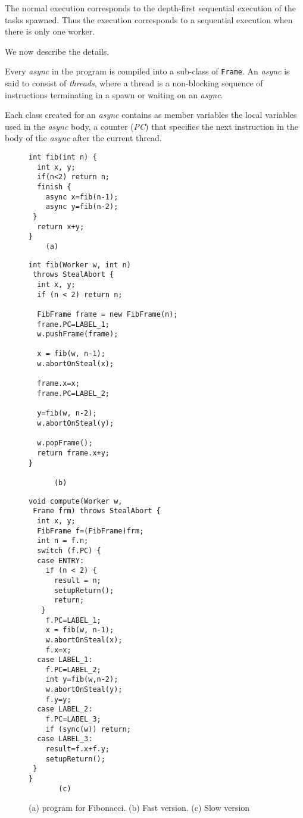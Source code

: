 The normal execution corresponds to the depth-first sequential
execution of the tasks spawned. Thus the execution corresponds to a
sequential execution when there is only one worker.

We now describe the details.

Every \emph{async} in the \Xten{} program is compiled into a sub-class
of {\tt Frame}. An \emph{async} is said to consist of {\em threads},
where a thread is a non-blocking sequence of instructions terminating
in a spawn or waiting on an \emph{async}.

Each class created for an \emph{async} contains as member variables the local
variables used in the \emph{async} body, a counter ({\em PC}) that specifies
the next instruction in the body of the \emph{async} after the current
thread.

\begin{figure*}
\begin{minipage}{0.25\textwidth}
\scriptsize
\begin{verbatim}
int fib(int n) {
  int x, y;
  if(n<2) return n;
  finish {
    async x=fib(n-1);
    async y=fib(n-2);
 }
  return x+y;
}
    (a)
\end{verbatim}
\end{minipage}%
\begin{minipage}{0.4\textwidth}
\scriptsize
\begin{verbatim}
int fib(Worker w, int n) 
 throws StealAbort { 
  int x, y;
  if (n < 2) return n;

  FibFrame frame = new FibFrame(n);
  frame.PC=LABEL_1;
  w.pushFrame(frame);

  x = fib(w, n-1);
  w.abortOnSteal(x);

  frame.x=x;
  frame.PC=LABEL_2;

  y=fib(w, n-2);
  w.abortOnSteal(y);

  w.popFrame();
  return frame.x+y;
}

      (b)
\end{verbatim}
\end{minipage}%
\begin{minipage}{0.45\textwidth}
\scriptsize
\begin{verbatim}
void compute(Worker w, 
 Frame frm) throws StealAbort {
  int x, y;
  FibFrame f=(FibFrame)frm;
  int n = f.n;
  switch (f.PC) {
  case ENTRY: 
    if (n < 2) {
      result = n;
      setupReturn();
      return;
   }
    f.PC=LABEL_1;
    x = fib(w, n-1);
    w.abortOnSteal(x);
    f.x=x;
  case LABEL_1: 
    f.PC=LABEL_2;
    int y=fib(w,n-2);
    w.abortOnSteal(y);
    f.y=y;
  case LABEL_2: 
    f.PC=LABEL_3;
    if (sync(w)) return;
  case LABEL_3:
    result=f.x+f.y;
    setupReturn();
 }
}
       (c)
\end{verbatim}
\end{minipage}%
\caption{(a) \Xten{} program for Fibonacci. (b) Fast version. (c) Slow version}%
\label{fig:fib-ill}
\end{figure*}

